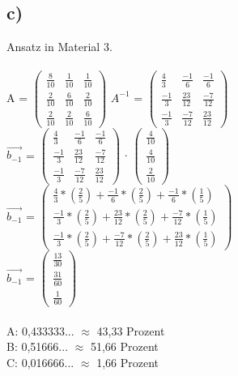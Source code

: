 \documentclass{article}
\begin{document}
	\subsection*{c)}
	Ansatz in Material 3. \\ \\
	A = 
	$\left(\begin{array}{ccc}
	\frac{8}{10} & \frac{1}{10} & \frac{1}{10} \\ \frac{2}{10} & \frac{6}{10} & \frac{2}{10} \\ \frac{2}{10} & \frac{2}{10} &\frac{6}{10}
	\end{array}\right)$ 
	$A^{-1}$ = 
	$
	\left(\begin{matrix}
		\frac{4}{3} & \frac{-1}{6} & \frac{-1}{6} \\
		\frac{-1}{3} & \frac{23}{12} & \frac{-7}{12} \\
		\frac{-1}{3} & \frac{-7}{12} & \frac{23}{12}
	\end{matrix}\right)
	$ \\
	$\vec{b_{-1}}$ = 
	$
	\left(\begin{matrix}
	\frac{4}{3} & \frac{-1}{6} & \frac{-1}{6} \\
	\frac{-1}{3} & \frac{23}{12} & \frac{-7}{12} \\
	\frac{-1}{3} & \frac{-7}{12} & \frac{23}{12}
	\end{matrix}\right)
	$
	$\cdot$
	$
	\left(\begin{array}{c}
	\frac{4}{10} \\ \frac{4}{10} \\ \frac{2}{10} 
	\end{array}\right)
	$ \\
	$\vec{b_{-1}}$ =
	$
	\left(\begin{matrix}
	\frac{4}{3}*\left(\frac{2}{5}\right)+\frac{-1}{6}*\left(\frac{2}{5}\right)+\frac{-1}{6}*\left(\frac{1}{5}\right) \\
	\frac{-1}{3}*\left(\frac{2}{5}\right)+\frac{23}{12}*\left(\frac{2}{5}\right)+\frac{-7}{12}*\left(\frac{1}{5}\right) \\
	\frac{-1}{3}*\left(\frac{2}{5}\right)+\frac{-7}{12}*\left(\frac{2}{5}\right)+\frac{23}{12}*\left(\frac{1}{5}\right)
	\end{matrix}\right)
	$ \\
	$\vec{b_{-1}}$ =
	$
	\left(\begin{matrix}
	\frac{13}{30} \\
	\frac{31}{60} \\
	\frac{1}{60}
	\end{matrix}\right)
	$ \\ \\
	A: 0,433333... $\approx$ 43,33 Prozent \\
	B: 0,51666... $\approx$ 51,66 Prozent \\
	C: 0,016666... $\approx$ 1,66 Prozent
\end{document}
